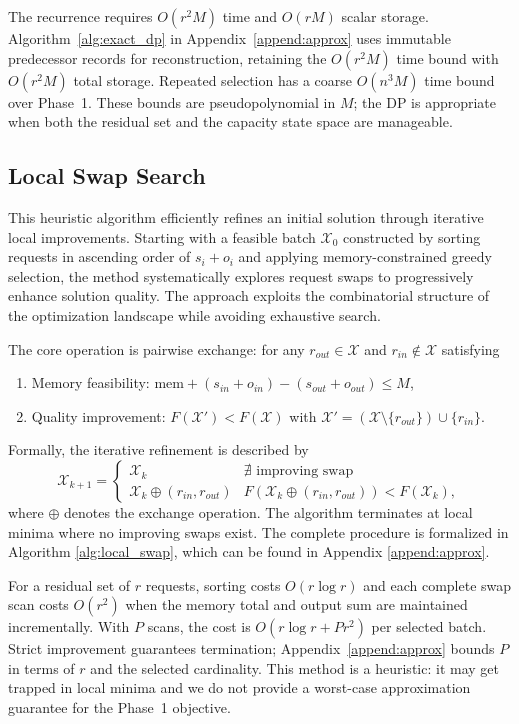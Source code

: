 \documentclass[nonblindrev]{informs3_hide}
\begin{document}
The recurrence requires $O(r^2M)$ time and $O(rM)$ scalar storage. Algorithm~\ref{alg:exact_dp} in Appendix~\ref{append:approx} uses immutable predecessor records for reconstruction, retaining the $O(r^2M)$ time bound with $O(r^2M)$ total storage. Repeated selection has a coarse $O(n^3M)$ time bound over Phase~1. These bounds are pseudopolynomial in $M$; the DP is appropriate when both the residual set and the capacity state space are manageable.

\subsection{Local Swap Search}

This heuristic algorithm efficiently refines an initial solution through iterative local improvements. Starting with a feasible batch $\mathcal{X}_0$ constructed by sorting requests in ascending order of $s_i + o_i$ and applying memory-constrained greedy selection, the method systematically explores request swaps to progressively enhance solution quality. The approach exploits the combinatorial structure of the optimization landscape while avoiding exhaustive search.

The core operation is pairwise exchange: for any $r_{out} \in \mathcal{X}$ and $r_{in} \notin \mathcal{X}$ satisfying
\begin{enumerate}
    \item Memory feasibility: $\text{mem} + (s_{in} + o_{in}) - (s_{out} + o_{out}) \leq M$,
    \item Quality improvement: $F(\mathcal{X}') < F(\mathcal{X})$ with $\mathcal{X}' = (\mathcal{X} \setminus \{r_{out}\}) \cup \{r_{in}\}$.
\end{enumerate}

Formally, the iterative refinement is described by
$$
\mathcal{X}_{k+1} = 
\begin{cases} 
\mathcal{X}_k & \nexists \text{ improving swap} \\
\mathcal{X}_k \oplus (r_{in}, r_{out}) & F(\mathcal{X}_k \oplus (r_{in}, r_{out})) < F(\mathcal{X}_k),
\end{cases}
$$
where $\oplus$ denotes the exchange operation. The algorithm terminates at local minima where no improving swaps exist. The complete procedure is formalized in Algorithm \ref{alg:local_swap}, which can be found in Appendix \ref{append:approx}.

For a residual set of $r$ requests, sorting costs $O(r\log r)$ and each complete swap scan costs $O(r^2)$ when the memory total and output sum are maintained incrementally. With $P$ scans, the cost is $O(r\log r+Pr^2)$ per selected batch. Strict improvement guarantees termination; Appendix~\ref{append:approx} bounds $P$ in terms of $r$ and the selected cardinality. This method is a heuristic: it may get trapped in local minima and we do not provide a worst-case approximation guarantee for the Phase~1 objective.
\end{document}
